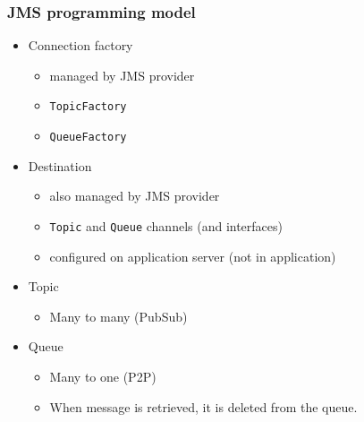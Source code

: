 \documentclass[10pt,xcolor=pdflatex]{beamer}
\begin{document}
\begin{frame}[containsverbatim]\frametitle{JMS programming model}
\begin{itemize}
	\item Connection factory
	  \begin{itemize}
	    \item managed by JMS provider
	    \item \texttt{TopicFactory}
	    \item \texttt{QueueFactory}
	  \end{itemize}
	\item Destination
	  \begin{itemize}
		\item also managed by JMS provider
		\item \texttt{Topic} and \texttt{Queue} channels (and interfaces)
        \item configured on application server (not in application)
	  \end{itemize}
    \item Topic
      \begin{itemize}
    	\item  Many to many (PubSub)
      \end{itemize}
    \item Queue
      \begin{itemize}
    	\item Many to one (P2P)
		\item When message is retrieved, it is deleted from the queue.
      \end{itemize}
\end{itemize}
\end{frame}
\end{document}
